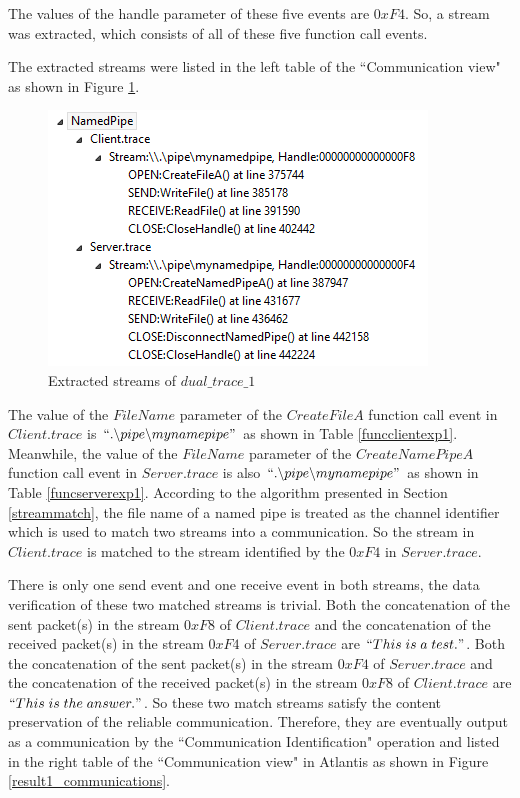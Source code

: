 \documentclass[12pt,oneside]{book}
\begin{document}
The values of the handle parameter of these five events are $0xF4$. So, a stream was extracted, which consists of all of these five function call events. 

The extracted streams were listed in the left table of the ``Communication view"  as shown in Figure \ref{result1_streams}.

\begin{figure}[H]
\centerline{\includegraphics{Figures/result1_streams}}
 \caption{Extracted streams of $dual\_trace\_1$}
\label{result1_streams}
\end{figure}

The value of the $FileName$ parameter of the $CreateFileA$ function call event in $Client.trace$ is $``.\backslash pipe \backslash mynamepipe"$ as shown in Table \ref{funcclientexp1}. Meanwhile, the value of the $FileName$ parameter of the $CreateNamePipeA$ function call event in $Server.trace$ is also $``.\backslash pipe \backslash mynamepipe"$ as shown in Table \ref{funcserverexp1}. According to the algorithm presented in Section \ref{streammatch}, the file name of a named pipe is treated as the channel identifier which is used to match two streams into a communication. So the stream in $Client.trace$ is matched to the stream identified by the $0xF4$ in $Server.trace$.

There is only one send event and one receive event in both streams, the data verification of these two matched streams is trivial. Both the concatenation of the sent packet(s) in the stream $0xF8$ of $Client.trace$ and the concatenation of the received packet(s) in the stream $0xF4$ of $Server.trace$ are $``This\; is\; a\; test."$. Both the concatenation of the sent packet(s) in the stream $0xF4$ of $Server.trace$ and the concatenation of the received packet(s) in the stream $0xF8$ of $Client.trace$ are $``This\; is\; the\; answer."$. So these two match streams satisfy the content preservation of the reliable communication. Therefore, they are eventually output as a communication by the ``Communication Identification" operation and listed in the right table of the ``Communication view" in Atlantis as shown in Figure \ref{result1_communications}.
\end{document}
